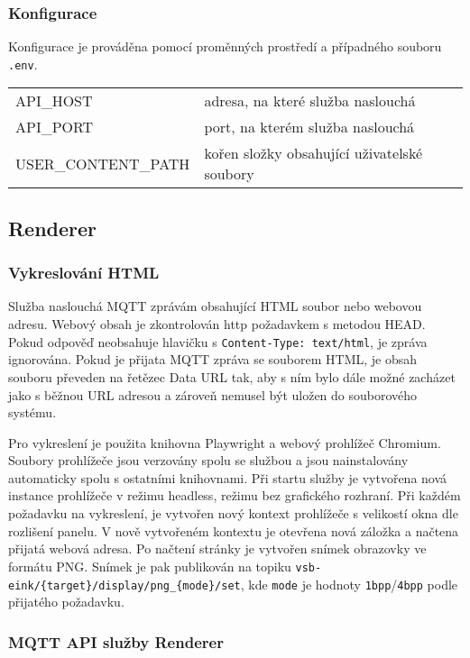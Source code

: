\subsubsection{Konfigurace}
Konfigurace je prováděna pomocí proměnných prostředí a případného souboru \lstinline{.env}.

\begin{table}[h]
    \begin{tabular}{ll}
        API\_HOST & adresa, na které služba naslouchá \\
        API\_PORT & port, na kterém služba naslouchá \\
        USER\_CONTENT\_PATH & kořen složky obsahující uživatelské soubory \\
    \end{tabular}
\end{table}

\vfill

\subsection{Renderer}
\subsubsection{Vykreslování HTML}
Služba naslouchá MQTT zprávám obsahující HTML soubor nebo webovou adresu. Webový obsah je zkontrolován http požadavkem s metodou HEAD. Pokud odpověď neobsahuje hlavičku s \lstinline|Content-Type: text/html|, je zpráva ignorována. Pokud je přijata MQTT zpráva se souborem HTML, je obsah souboru převeden na řetězec Data URL tak, aby s ním bylo dále možné zacházet jako s běžnou URL adresou a zároveň nemusel být uložen do souborového systému.

Pro vykreslení je použita knihovna Playwright a webový prohlížeč Chromium. Soubory prohlížeče jsou verzovány spolu se službou a jsou nainstalovány automaticky spolu s ostatními knihovnami. Při startu služby je vytvořena nová instance prohlížeče v režimu headless, režimu bez grafického rozhraní. Při každém požadavku na vykreslení, je vytvořen nový kontext prohlížeče s velikostí okna dle rozlišení panelu. V nově vytvořeném kontextu je otevřena nová záložka a načtena přijatá webová adresa. Po načtení stránky je vytvořen snímek obrazovky ve formátu PNG. Snímek je pak publikován na topiku \lstinline|vsb-eink/{target}/display/png_{mode}/set|, kde \lstinline|mode| je hodnoty \lstinline|1bpp|/\lstinline|4bpp| podle přijatého požadavku.

\subsubsection{MQTT API služby Renderer}

